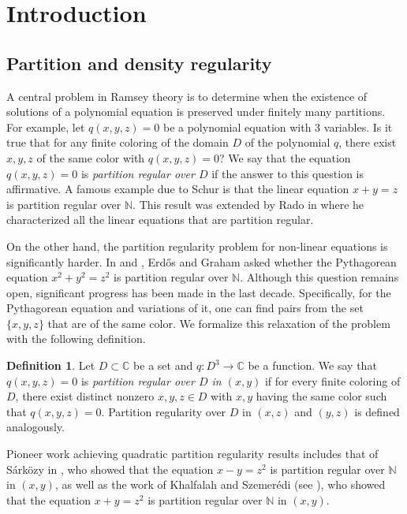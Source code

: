 \documentclass[11pt]{amsart}
\theoremstyle{definition}
\newtheorem{definition}[lemma]{Definition}
\newcommand{\C}{{\mathbb C}}
\newcommand{\N}{{\mathbb N}}
\newcommand{\SD}[1]{{\color{green!60!black}{{#1}}}}
\begin{document}
\section{Introduction}\label{s1}
\subsection{Partition and density regularity}
A central problem in Ramsey theory is to determine when the existence of solutions of a polynomial equation is preserved under finitely many partitions. For example, let $q(x,y,z)=0$ be a polynomial equation with 3 variables. Is it true that for any finite coloring of the domain $D$ of the polynomial $q$, there exist $x,y,z$ of the same color with $q(x,y,z)=0$? We say that the equation $q(x,y,z)=0$ is \emph{partition regular over $D$} if the answer to this question is affirmative. A famous example due to Schur \cite{Schur} is that the linear equation $x+y=z$ is partition regular over $\N$. This result was extended by Rado in \cite{Rado} where he characterized all the linear equations that are partition regular.

On the other hand, the partition regularity problem for non-linear equations is significantly harder. In \cite{Gr07} and \cite{Gr08}, Erd\H{o}s and Graham asked whether the Pythagorean equation $x^{2}+y^{2}=z^{2}$ is partition regular over $\N$. 
Although this question remains open, significant progress has been made in the last decade. Specifically, for the Pythagorean equation and variations of it, one can find pairs from the set $\{x,y,z\}$ that are of the same color. We formalize this relaxation of the problem with the following definition. 

\begin{definition}
    Let $D \subset \C$ be a set and $q\colon D^{3}\to \C$ be a function. We say that $q(x,y,z)=0$ is \emph{partition regular over $D$ in $(x,y)$} if for every finite coloring of $D$, there exist distinct nonzero $x,y,z\in D$ with $x,y$ having the same color  such that $q(x,y,z)=0$. Partition regularity over $D$ in  $(x,z)$ and $(y,z)$ is defined analogously.
\end{definition} %
Pioneer work achieving quadratic partition regularity results includes that of S\'ark\"{o}zy in \cite{sarkozy_1978a}, who showed that the equation $x-y=z^{2}$ is partition regular over $\N$ in $(x,y)$, as well as the work of Khalfalah and Szemer\'{e}di (see \cite{KS06}), who showed that the equation $x+y=z^{2}$ is partition regular over $\N$ in  $(x,y)$. 
\end{document}

